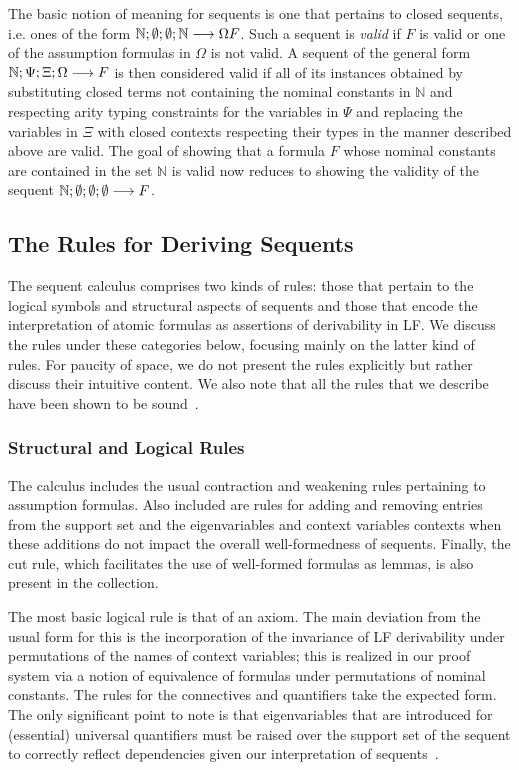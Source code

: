 The basic notion of meaning for sequents is one that pertains to
closed sequents, i.e. ones of the form
$\mathbb{N};\emptyset;\emptyset;\mathbb{N}\longrightarrow\Omega{F}$. 
%
Such a sequent is \emph{valid} if $F$ is valid or one of the
assumption formulas in $\Omega$ is not valid.
%
A sequent of the general form
$\mathbb{N};\Psi;\Xi;\Omega\longrightarrow F$ is then considered valid if
all of its instances obtained by substituting closed terms not
containing the nominal constants in $\mathbb{N}$ and respecting arity
typing constraints for the variables in $\Psi$ and replacing the
variables in $\Xi$ with closed contexts respecting their types in the
manner described above are valid.
%
The goal of showing that a formula $F$ whose nominal
constants are contained in the set $\mathbb{N}$ is valid now reduces to
showing the validity of the sequent $\mathbb{N};\emptyset;\emptyset;\emptyset\longrightarrow F$.

\subsection{The Rules for Deriving Sequents}\label{ssec:proofrules}

The sequent calculus comprises two kinds of rules: those that pertain
to the logical symbols and structural aspects of sequents and those
that encode the interpretation of atomic formulas as assertions of
derivability in LF. We discuss the rules under these categories below,
focusing mainly on the latter kind of rules. For paucity of space, we
do not present the rules explicitly but rather discuss their intuitive
content. We also note that all the rules that we describe have been
shown to be sound~\cite{nadathur21arxiv}.

\subsubsection{Structural and Logical Rules}

The calculus includes the usual contraction and weakening rules
pertaining to assumption formulas.
%
Also included are rules for adding and removing entries from the
support set and the eigenvariables and context variables contexts when
these additions do not impact the overall well-formedness of
sequents.
%
Finally, the cut rule, which facilitates the use of well-formed
formulas as lemmas, is also present in the collection.

The most basic logical rule is that of an axiom.
%
The main deviation from the usual form for this is the
incorporation of the invariance of LF derivability under permutations
of the names of context variables; this is realized in our proof
system via a notion of equivalence of formulas under permutations of nominal
constants.   
%
The rules for the connectives and quantifiers take the expected form.
%
The only significant point to note is that eigenvariables that are
introduced for (essential) universal quantifiers must be
raised over the support set of the sequent to correctly reflect
dependencies given our interpretation of sequents~\cite{miller92jsc}.

